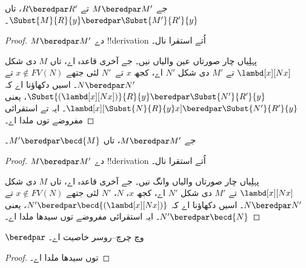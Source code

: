 \documentclass[../../../include/open-logic-section]{subfiles}
\begin{document}
\begin{lem}
  جے $M \beredpar M'$ تے $R \beredpar R'$، تاں $\Subst{M}{R}{y}
  \beredpar \Subst{M'}{R'}{y}$۔
\end{lem}

\begin{proof}
  $M \beredpar M'$ دے !!{derivation} اُتے استقرا نال۔

  پہلِیاں چار صورتاں عین  والیاں نیں۔
  جے آخری قاعدہ  اے، تاں $M$ دی شکل
  $\lambd[x][Nx]$ تے $M'$ دی شکل $N'$ اے، کجھ $x$ تے~$N'$ لئی
  جتھے $x \notin
  FV(N)$ تے $N \beredpar N'$۔ اسیں دکھاؤنا اے کہ
  $\Subst{(\lambd[x][Nx])}{R}{y} \beredpar \Subst{N'}{R'}{y}$، یعنی
  $\lambd[x][\Subst{N}{R}{y} x] \beredpar \Subst{N'}{R'}{y}$۔ ایہ
   تے استقرائی مفروضے توں ملدا اے۔
\end{proof}

\begin{lem}
  جے $M \beredpar M'$، تاں $M' \beredpar \becd{M}$۔
\end{lem}

\begin{proof}
  $M \beredpar M'$ دے !!{derivation} اُتے استقرا نال۔

  پہلِیاں چار صورتاں  والیاں وانگ نیں۔
  جے آخری قاعدہ  اے، تاں $M$ دی شکل
  $\lambd[x][Nx]$ تے $M'$ دی شکل $N'$ اے، کجھ $x$، $N$، $N'$ لئی
  جتھے $x \notin FV(N)$ تے $N
  \beredpar N'$۔ اسیں دکھاؤنا اے کہ $N' \beredpar
  \becd{(\lambd[x][Nx])}$، یعنی $N' \beredpar \becd{N}$۔
  ایہ استقرائی مفروضے توں سیدھا ملدا اے۔
\end{proof}

\begin{thm}
  $\beredpar$ وچ چرچ–روسر خاصیت اے۔
\end{thm}

\begin{proof}
   توں سیدھا ملدا اے۔
\end{proof}
\end{document}
